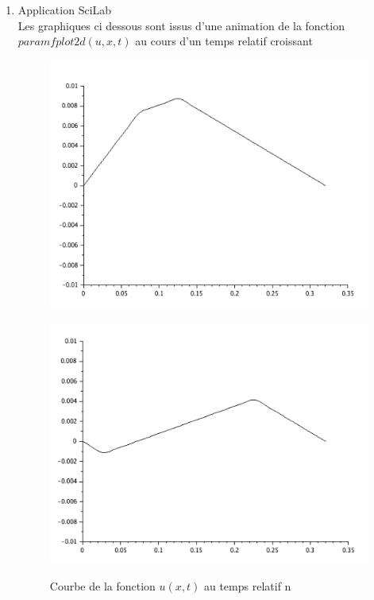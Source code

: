 \documentclass[a4paper,12pt]{report}
\begin{document}
\begin{enumerate}
	\item Application SciLab\\
	Les graphiques ci dessous sont issus d'une animation de la fonction $paramfplot2d(u,x,t)$ au cours d'un temps relatif croissant\\
\begin{figure}[h!]
   \begin{minipage}[b]{0.40\linewidth}
      \includegraphics[scale=0.3]{Guitare1.png}\\
	  \caption{Courbe  de la fonction $u(x,t)$ au temps relatif n}
   \end{minipage}\hfill
   \begin{minipage}[b]{0.48\linewidth}   
      \includegraphics[scale=0.3]{Guitare2.png}\\

\end{minipage}
\end{figure}
\end{enumerate}
\end{document}
